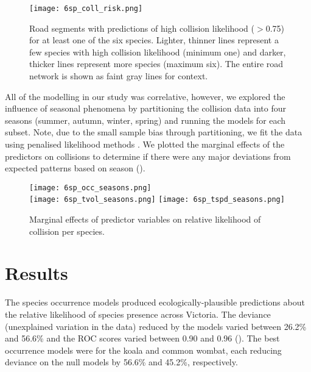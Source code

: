 \begin{figure*}[htp]
  \centering
  \texttt{[image: 6sp\_coll\_risk.png]}
  \caption[Road segments with predictions of high collision likelihood for six mammal species]{Road segments with predictions of high collision likelihood ($>$0.75) for at least one of the six species. Lighter, thinner lines represent a few species with high collision likelihood (minimum one) and darker, thicker lines represent more species (maximum six).  The entire road network is shown as faint gray lines for context.}
  \label{6sp_collrisk}
\end{figure*}

All of the modelling in our study was correlative, however, we explored the influence of seasonal phenomena by partitioning the collision data into four seasons (summer, autumn, winter, spring) and running the models for each subset. Note, due to the small sample bias through partitioning, we fit the data using penalised likelihood methods \citep{firt93}.  We plotted the marginal effects of the predictors on collisions to determine if there were any major deviations from expected patterns based on season ().

\begin{figure*}[htp]
  \centering
  \texttt{[image: 6sp\_occ\_seasons.png]}\\
  \texttt{[image: 6sp\_tvol\_seasons.png]}
  \texttt{[image: 6sp\_tspd\_seasons.png]}
  \caption[Marginal effects of predictor variables on relative likelihood of collision for six mammal species by season]{Marginal effects of predictor variables on relative likelihood of collision per species.}
  \label{6sp_seas_effects}
\end{figure*}

\section{Results}

The species occurrence models produced ecologically-plausible predictions about the relative likelihood of species presence across Victoria. The deviance (unexplained variation in the data) reduced by the models varied between 26.2\% and 56.6\% and the ROC scores varied between 0.90 and 0.96 (). The best occurrence models were for the koala and common wombat, each reducing deviance on the null models by 56.6\% and 45.2\%, respectively. 

